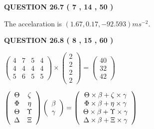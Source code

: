 \documentclass[12pt]{article}
\begin{document}
  
 
 
 
 
  
\vspace{0.2in}
  
{\textbf{\Large{QUESTION
26.7 
 (           7 ,          14 ,          50 )
}}}
  
  
 
 
\noindent{}
 
 
  The accelaration is $  %
(
1.67,
0.17,
-92.593)
ms^{-2} $.
 
 
 
 
  
\vspace{0.2in}
  
{\textbf{\Large{QUESTION
26.8 
 (           8 ,          15 ,          60 )
}}}
  
  
 
 
\noindent{}

 
$\left( \begin{array}{ccccccccccccccc}
           4  & 
           7  & 
           5  & 
           4  \\ 
           4  & 
           4  & 
           4  & 
           4  \\ 
           5  & 
           6  & 
           5  & 
           5
\end{array}\right) \times
\left( \begin{array}{c}
           2  \\ 
           2  \\ 
           2  \\ 
           2
\end{array}\right)  =
\left( \begin{array}{c}
          40  \\ 
          32  \\ 
          42
\end{array}\right)  $
 
$  %
 \left( \begin{array}
 {
 c
 c
 }
 \Theta & 
                    \zeta \\ 
 \Phi & 
 \eta \\ 
 \Theta & 
 \Upsilon \\ 
 \Delta & 
                    \Xi
 \end{array} \right)
 \left( \begin{array}
 {
 c
 }
 \beta \\ 
 \gamma
 \end{array} \right)
=
 \left( \begin{array}
 {
 c
 }
  \Theta \times  \beta +                     \zeta \times  \gamma \\ 
  \Phi \times  \beta +  \eta \times  \gamma \\ 
  \Theta \times  \beta +  \Upsilon \times  \gamma \\ 
  \Delta \times  \beta +                     \Xi \times  \gamma
 \end{array} \right)
$
 
\end{document}
